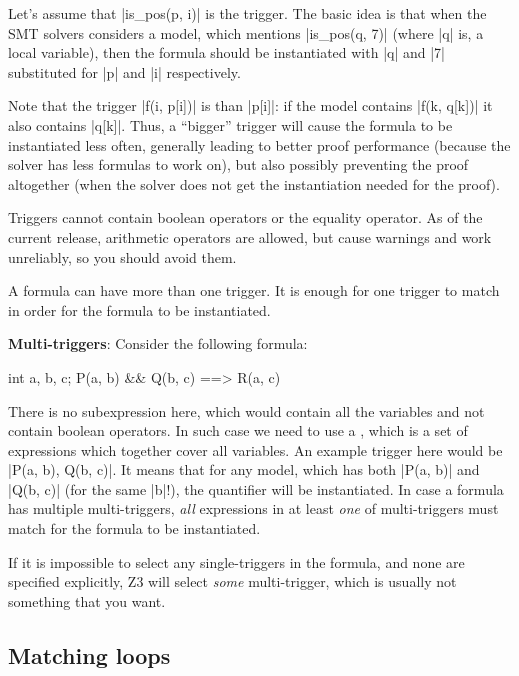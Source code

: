 Let's assume that \vcc|is_pos(p, i)| is the trigger. 
The basic idea is that when the SMT solvers considers a model,
which mentions \vcc|is_pos(q, 7)| (where \vcc|q| is, \eg a local variable), then the formula
should be instantiated with \vcc|q| and \vcc|7| substituted
for \vcc|p| and \vcc|i| respectively.

Note that the trigger \vcc|f(i, p[i])| is  than
\vcc|p[i]|: if the model contains \vcc|f(k, q[k])| it also contains \vcc|q[k]|.
Thus, a ``bigger'' trigger will cause the formula to be instantiated less often,
generally leading to better proof performance (because the solver has
less formulas to work on), but also possibly preventing
the proof altogether (when the solver does not get the instantiation needed for the proof).

Triggers cannot contain boolean operators or the equality operator.
As of the current release, arithmetic operators are allowed, but cause warnings
and work unreliably, so you should avoid them.

A formula can have more than one trigger.
It is enough for one trigger to match in order for the formula
to be instantiated.

\begin{note}
\textbf{Multi-triggers}:
Consider the following formula:
\begin{VCC}
\forall int a, b, c; P(a, b) && Q(b, c) ==> R(a, c)
\end{VCC}
There is no subexpression here, which would contain all the variables
and not contain boolean operators.
In such case we need to use a , which
is a set of expressions which together cover all variables.
An example trigger here would be \vcc|{P(a, b), Q(b, c)}|.
It means that for any model, which has both \vcc|P(a, b)|
and \vcc|Q(b, c)| (for the same \vcc|b|!), the quantifier
will be instantiated.
In case a formula has multiple multi-triggers, \emph{all}
expressions in at least \emph{one} of multi-triggers
must match for the formula to be instantiated.

If it is impossible to select any single-triggers in the formula,
and none are specified explicitly, Z3 will select \emph{some}
multi-trigger, which is usually not something that you want.
\end{note}

\subsection{Matching loops}

